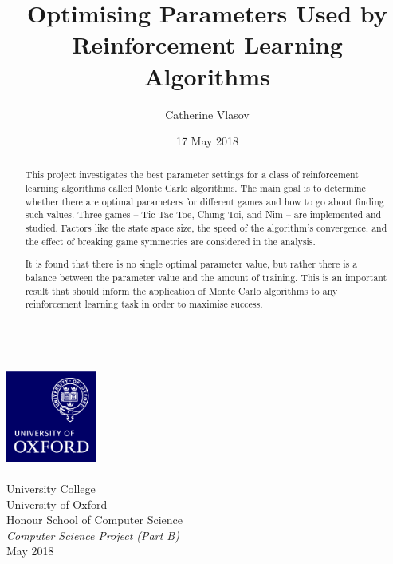 \documentclass[11pt,a4paper,twoside,openright]{report}
\author{Catherine Vlasov}
\title{Optimising Parameters Used by Reinforcement Learning Algorithms}
\date{17 May 2018}
\begin{document}

\makeatletter
	\begin{titlepage}
		\vspace*{\fill}
		\begin{center}
			{\huge \bfseries \@title }
			\\[20ex]
			\includegraphics[width=30mm]{oxlogo.png}
			\\[10ex]
			{\LARGE \@author}
			\\[3ex]
			{\Large University College}
			\\[1ex]
			{\Large University of Oxford}
			\\[8ex]
			{\Large Honour School of Computer Science}
			\\[1ex]
			{\Large \emph{Computer Science Project (Part B)}}
			\\[10ex]
			{\LARGE May 2018}
		\end{center}
		\vspace*{\fill}
	\end{titlepage}
\makeatother


\shipout\null


\begin{abstract}

This project investigates the best parameter settings for a class of reinforcement learning algorithms called Monte Carlo algorithms. The main goal is to determine whether there are optimal parameters for different games and how to go about finding such values. Three games -- Tic-Tac-Toe, Chung Toi, and Nim -- are implemented and studied. Factors like the state space size, the speed of the algorithm's convergence, and the effect of breaking game symmetries are considered in the analysis.

It is found that there is no single optimal parameter value, but rather there is a balance between the parameter value and the amount of training. This is an important result that should inform the application of Monte Carlo algorithms to any reinforcement learning task in order to maximise success.

\end{abstract}


\shipout\null
{}
\end{document}
